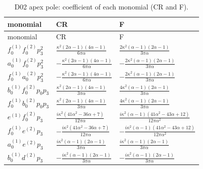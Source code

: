 {\small\begin{longtable}{lll}\caption{D02 apex pole: coefficient of each monomial (CR and F).}\label{tab:D02}\\\toprule
monomial & CR & F\\\midrule\endfirsthead
\toprule monomial & CR & F\\\midrule\endhead
$f_0^{(1)} f_0^{(2)} p_3^{2}$ & $\frac{\kappa^{2} \left(2 \alpha - 1\right) \left(4 \alpha - 1\right)}{6 \pi \alpha}$ & $\frac{2 \kappa^{2} \left(\alpha - 1\right) \left(2 \alpha - 1\right)}{3 \pi \alpha}$\\
$a_0^{(1)} f_0^{(2)} p_3^{2}$ & $- \frac{\kappa^{2} \left(2 \alpha - 1\right) \left(4 \alpha - 1\right)}{6 \pi \alpha}$ & $- \frac{2 \kappa^{2} \left(\alpha - 1\right) \left(2 \alpha - 1\right)}{3 \pi \alpha}$\\
$f_0^{(1)} a_0^{(2)} p_3^{2}$ & $- \frac{\kappa^{2} \left(2 \alpha - 1\right) \left(4 \alpha - 1\right)}{6 \pi \alpha}$ & $- \frac{2 \kappa^{2} \left(\alpha - 1\right) \left(2 \alpha - 1\right)}{3 \pi \alpha}$\\
$b_0^{(1)} f_0^{(2)} p_0 p_3$ & $\frac{\kappa^{2} \left(2 \alpha - 1\right) \left(4 \alpha - 1\right)}{3 \pi \alpha}$ & $\frac{4 \kappa^{2} \left(\alpha - 1\right) \left(2 \alpha - 1\right)}{3 \pi \alpha}$\\
$f_0^{(1)} b_0^{(2)} p_0 p_3$ & $\frac{\kappa^{2} \left(2 \alpha - 1\right) \left(4 \alpha - 1\right)}{3 \pi \alpha}$ & $\frac{4 \kappa^{2} \left(\alpha - 1\right) \left(2 \alpha - 1\right)}{3 \pi \alpha}$\\
$e^{(1)} f_0^{(2)} p_3$ & $\frac{i \kappa^{2} \left(41 \alpha^{2} - 36 \alpha + 7\right)}{12 \pi \alpha}$ & $\frac{i \kappa^{2} \left(\alpha - 1\right) \left(41 \alpha^{2} - 43 \alpha + 12\right)}{12 \pi \alpha^{2}}$\\
$f_0^{(1)} e^{(2)} p_3$ & $- \frac{i \kappa^{2} \left(41 \alpha^{2} - 36 \alpha + 7\right)}{12 \pi \alpha}$ & $- \frac{i \kappa^{2} \left(\alpha - 1\right) \left(41 \alpha^{2} - 43 \alpha + 12\right)}{12 \pi \alpha^{2}}$\\
$a_0^{(1)} e^{(2)} p_3$ & $\frac{i \kappa^{2} \left(\alpha - 1\right) \left(2 \alpha - 1\right)}{3 \pi \alpha}$ & $\frac{i \kappa^{2} \left(\alpha - 1\right) \left(2 \alpha - 1\right)}{3 \pi \alpha}$\\
$b_0^{(1)} d^{(2)} p_3$ & $- \frac{i \kappa^{2} \left(\alpha - 1\right) \left(2 \alpha - 1\right)}{3 \pi \alpha}$ & $- \frac{i \kappa^{2} \left(\alpha - 1\right) \left(2 \alpha - 1\right)}{3 \pi \alpha}$\\

\end{longtable}}
